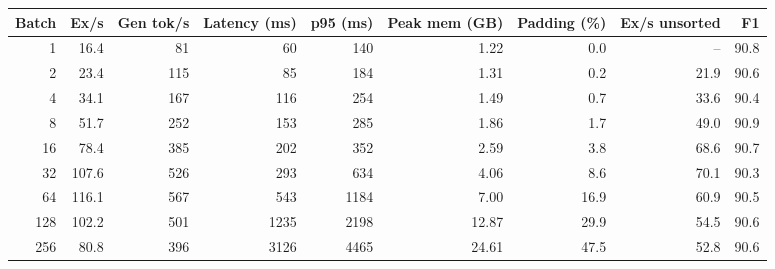\begin{tabular}{rrrrrrrrr}
\toprule
Batch & Ex/s & Gen tok/s & Latency (ms) & p95 (ms) & Peak mem (GB) & Padding (\%) & Ex/s unsorted & F1 \\
\midrule
1 & 16.4 & 81 & 60 & 140 & 1.22 & 0.0 & -- & 90.8 \\
2 & 23.4 & 115 & 85 & 184 & 1.31 & 0.2 & 21.9 & 90.6 \\
4 & 34.1 & 167 & 116 & 254 & 1.49 & 0.7 & 33.6 & 90.4 \\
8 & 51.7 & 252 & 153 & 285 & 1.86 & 1.7 & 49.0 & 90.9 \\
16 & 78.4 & 385 & 202 & 352 & 2.59 & 3.8 & 68.6 & 90.7 \\
32 & 107.6 & 526 & 293 & 634 & 4.06 & 8.6 & 70.1 & 90.3 \\
64 & 116.1 & 567 & 543 & 1184 & 7.00 & 16.9 & 60.9 & 90.5 \\
128 & 102.2 & 501 & 1235 & 2198 & 12.87 & 29.9 & 54.5 & 90.6 \\
256 & 80.8 & 396 & 3126 & 4465 & 24.61 & 47.5 & 52.8 & 90.6 \\
\bottomrule
\end{tabular}